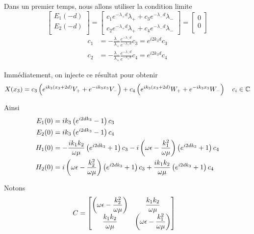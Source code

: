 Dans un premier temps, nous allons utiliser la condition limite 
\begin{equation}
    \begin{bmatrix}
        E_1(-d)\\
        E_2(-d)\\
    \end{bmatrix}
    =
    \begin{bmatrix}
        c_1 e^{-\lambda_+ d} \lambda_{+} + c_3 e^{-\lambda_- d} \lambda_{-} \\
        c_2 e^{-\lambda_+ d} \lambda_{+} + c_4 e^{-\lambda_- d} \lambda_{-}
    \end{bmatrix}
    =
    \begin{bmatrix}
        0\\
        0\\
    \end{bmatrix}
\end{equation}
\begin{align}
    c_1 &= -\frac{\lambda_-}{\lambda_+}\frac{e^{-\lambda_-d}}{e^{-\lambda_+d}}c_3 = e^{i2k_3d}c_3\\
    c_2 &= -\frac{\lambda_-}{\lambda_+}\frac{e^{-\lambda_-d}}{e^{-\lambda_+d}}c_4 = e^{i2k_3d}c_4
\end{align}


Immédiatement, on injecte ce résultat pour obtenir
\begin{equation}
    X(x_3) = c_3\left(e^{ik_3(x_3 + 2d)}V_+ + e^{-ik_3x_3}V_- \right)  + c_4\left(e^{ik_3(x_3 + 2d)}W_+ + e^{-ik_3 x_3}W_- \right) \quad c_i \in \mathbb C
\end{equation}

Ainsi
\begin{align}
     E_1(0) &= ik_3\left(e^{i2dk_3} - 1\right)c_3 \\
     E_2(0) &= ik_3\left(e^{i2dk_3} - 1\right)c_4 \\
     H_1(0) &= 
        -\dfrac{ik_1k_2}{\omega\mu}\left(e^{i2dk_3} + 1\right)c_3 
        - i\left(\omega\epsilon-\dfrac{k_1^2}{\omega\mu}\right)\left( e^{i2dk_3} + 1 \right)c_4 \\
     H_2(0) &=
         i\left(\omega\epsilon-\dfrac{k_2^2}{\omega\mu}\right)\left( e^{i2dk_3} + 1 \right)c_3
        + \dfrac{ik_1k_2}{\omega\mu}\left(e^{i2dk_3} + 1\right)c_4
\end{align}

Notons
\begin{align}
    C &=
    \begin{bmatrix}
        \left(\omega\epsilon-\dfrac{k_2^2}{\omega\mu}\right) & \dfrac{k_1k_2}{\omega\mu}\\
        \dfrac{k_1k_2}{\omega\mu} & \left(\omega\epsilon-\dfrac{k_1^2}{\omega\mu}\right)
    \end{bmatrix}
\end{align}

